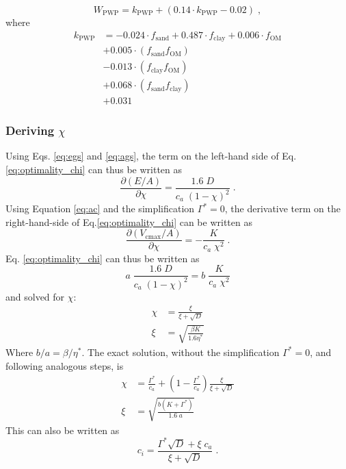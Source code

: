 \documentclass{myreport}
\begin{document}
\begin{equation}
W_{\text{PWP}} = k_\text{PWP}+(0.14\cdot k_\text{PWP}-0.02) \;,
\end{equation}
where
\begin{align}
k_\text{PWP} & = -0.024 \cdot f_{\text{sand}} + 0.487 \cdot f_{\text{clay}} + 0.006 \cdot f_{\text{OM}} \\
                  &+0.005 \cdot ( f_{\text{sand}} f_{\text{OM}} )\\
                  &-0.013 \cdot ( f_{\text{clay}} f_{\text{OM}} )\\
                  &+0.068 \cdot ( f_{\text{sand}} f_{\text{clay}} )\\
                  &+0.031
\end{align}


\subsubsection{Deriving $\chi$}
\label{sec:steps_chi}

Using Eqs. \ref{eq:egs} and \ref{eq:ags}, the term on the left-hand side of Eq. \ref{eq:optimality_chi} can thus be written as
\begin{equation}
\label{eq:partial1}
    \frac{\partial (E/A)}{\partial \chi} = \frac{1.6\;D}{c_a\;(1-\chi)^2}\;.
\end{equation}
Using Equation \ref{eq:ac} and the simplification $\Gamma^{\ast}=0$, the derivative term on the right-hand-side of Eq.\ref{eq:optimality_chi} can be written as
\begin{equation}
\label{eq:partial2}
    \frac{\partial (V_{\mathrm{cmax}}/A)}{\partial \chi} = - \frac{K}{c_a\;\chi^2}\;.
\end{equation}
Eq. \ref{eq:optimality_chi} can thus be written as
\begin{equation}
    a\;\frac{1.6\;D}{c_a\;(1-\chi)^2} = b\;\frac{K}{c_a\;\chi^2}
\end{equation}
and solved for $\chi$:
\begin{align}
    \chi &= \frac{\xi}{\xi + \sqrt{D}} \\ 
    \xi &= \sqrt{\frac{\beta K}{1.6 \eta^\ast}}
\end{align}
Where $b/a=\beta/\eta^\ast$. The exact solution, without the simplification $\Gamma^{\ast}=0$, and following analogous steps, is 
\begin{align}
\label{eq:chi_exact}
    \chi &= \frac{\Gamma^{\ast}}{c_a} + \left(1- \frac{\Gamma^{\ast}}{c_a}\right)\frac{\xi}{\xi + \sqrt{D}}\\
    \xi &= \sqrt{\frac{b(K+\Gamma^{\ast})}{1.6\;a}}
\end{align}
This can also be written as
\begin{equation}
\label{eq:ci}
    c_i = \frac{\Gamma^{\ast}\sqrt{D}+ \xi\;c_a}{\xi + \sqrt{D}} \;. 
\end{equation}
\end{document}
